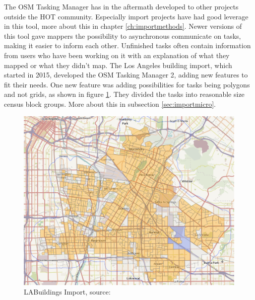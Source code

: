 The OSM Tasking Manager has in the aftermath developed to other projects outside the HOT community. Especially import projects have had good leverage in this tool, more about this in chapter \ref{ch:importmethods}. Newer versions of this tool gave mappers the possibility to asynchronous communicate on tasks, making it easier to inform each other. Unfinished tasks often contain information from users who have been working on it with an explanation of what they mapped or what they didn't map. The Los Angeles building import, which started in 2015, developed the OSM Tasking Manager 2, adding new features to fit their needs. One new feature was adding possibilities for tasks being polygons and not grids, as shown in figure \ref{fig:project20}. They divided the tasks into reasonable size census block groups. More about this in subsection \ref{sec:importmicro}. 

\begin{figure}[H]
    \centering
    \includegraphics[scale=0.3]{figures/FixedByMe/taskingman2.png}
    \caption{LABuildings Import, source: \cite{LAOSM}}
    \label{fig:project20}
\end{figure} 


